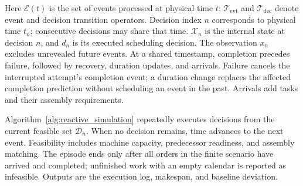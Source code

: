 Here $\mathcal E(t)$ is the set of events processed at physical time $t$;
$\mathcal T_{\mathrm{evt}}$ and $\mathcal T_{\mathrm{dec}}$ denote event and decision transition operators.
Decision index $n$ corresponds to physical time $t_n$; consecutive decisions may share that time.
$\mathcal X_n$ is the internal state at decision $n$, and $d_n$ is its executed scheduling decision.
The observation $x_n$ excludes unrevealed future events. At a shared timestamp, completion precedes failure,
followed by recovery, duration updates, and arrivals. Failure cancels the interrupted attempt's completion event;
a duration change replaces the affected completion prediction without scheduling an event in the past.
Arrivals add tasks and their assembly requirements.













Algorithm~\ref{alg:reactive_simulation} repeatedly executes decisions from the current feasible set $\mathcal D_n$.
When no decision remains, time advances to the next event. Feasibility includes machine capacity,
predecessor readiness, and assembly matching. The episode ends only after all orders in the finite scenario have arrived and completed; unfinished work with an empty calendar is reported as infeasible.
Outputs are the execution log, makespan, and baseline deviation.





















